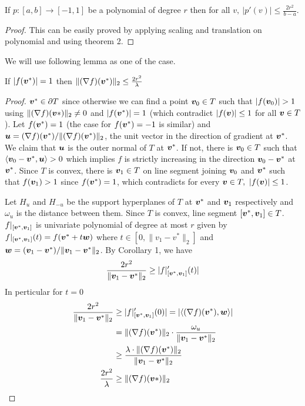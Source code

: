 {\begin{corollary}
If $p:[a,b] \to [-1,1]$ be a polynomial of degree $r$ then for all $v,\ |p'(v)| \le \frac{2r^2}{b-a}$.
\end{corollary}
\begin{proof}
This can be easily proved by applying scaling and translation on polynomial and using theorem 2.
\end{proof}
We will use following lemma as one of the case.
\begin{lemma}
If $|f(\bm v^*)| = 1$ then $\|(\nabla f)(\bm v^*)\|_2 \le \frac{2r^2}{\lambda}$
\end{lemma}
\begin{proof}
$\bm v^* \in \partial T$ since otherwise we can find a point $\bm v_0 \in T$ such that $|f(\VEC v_0)|>1$ using $\|(\nabla f)(\bm v*)\|_2 \ne 0$ and $|f(\bm v^*)| = 1$ (which contradict $|f(\bm v)| \le 1$ for all $\bm v \in T$). Let $f(\bm v^*) = 1$ (the case for $f(\bm v^*) = -1$ is similar) and $\bm u = (\nabla f)(\bm v^*) / \|(\nabla f)(\bm v^*)\|_2$, the unit vector in the direction of gradient at $\bm v^*$. We claim that $\bm u$ is the outer normal of $T$ at $\bm v^*$. If not, there is $\bm v_0 \in T$ such that $\langle \bm v_0-\bm v^*,\bm u\rangle > 0$ which implies $f$ is strictly increasing in the direction $\bm v_0-\bm v^*$ at $\bm v^*$. Since $T$ is convex, there is $\bm v_1 \in T$ on line segment joining $\bm v_0$ and $\bm v^*$ such that $f(\bm v_1) >1$ since $f(\bm v^*) = 1$, which contradicts for every $\bm v \in T,\ |f(\bm v)| \le 1$. 
\npara

Let $H_u$ and $H_{-u}$ be the support hyperplanes of $T$ at $\bm v^*$ and $\bm v_1$ respectively and $\omega_u$ is the distance between them. Since $T$ is convex, line segment $[\bm v^*,\bm v_1] \in T$. $f|_{[\bm v^*,\bm v_1]}$ is univariate polynomial of degree at most $r$ given by $f|_{[\bm v^*,\bm v_1]}(t) = f(\bm v^*+t\bm w)$ where $t \in [0,\|v_1-v^*\|_2]$ and $\bm w=(\bm v_1-\bm v^*)/\|\bm v_1-\bm v^*\|_2$. By Corollary 1, we have
$$\frac{2r^2}{\|\bm v_1-\bm v^*\|_2} \ge |f|_{[\bm v^*,\bm v_1]}'(t)|$$
In perticular for $t=0$
\begin{align*}\frac{2r^2}{\|\bm v_1-\bm v^*\|_2} &\ge |f|_{[\bm v^*,\bm v_1]}'(0)|=|\langle (\nabla f)(\bm v^*),\bm w\rangle|\\&=\|(\nabla f)(\bm v^*)\|_2 \cdot \frac{\omega_u}{\|\bm v_1-\bm v^*\|_2}\\&\ge \frac{\lambda \cdot \|(\nabla f)(\bm v^*)\|_2}{\|\bm v_1-\bm v^*\|_2}\\\frac{2r^2}{\lambda} &\ge \|(\nabla f)(\bm v*)\|_2
\end{align*}
\end{proof}

}
